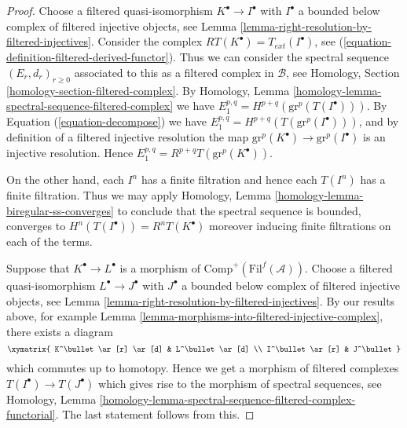 \begin{proof}
Choose a filtered quasi-isomorphism $K^\bullet \to I^\bullet$
with $I^\bullet$ a bounded below complex of filtered injective objects, see
Lemma \ref{lemma-right-resolution-by-filtered-injectives}.
Consider the complex $RT(K^\bullet) = T_{ext}(I^\bullet)$, see
(\ref{equation-definition-filtered-derived-functor}).
Thus we can consider the spectral sequence
$(E_r, d_r)_{r \geq 0}$ associated to
this as a filtered complex in $\mathcal{B}$, see
Homology, Section \ref{homology-section-filtered-complex}.
By
Homology, Lemma \ref{homology-lemma-spectral-sequence-filtered-complex}
we have $E_1^{p, q} = H^{p + q}(\text{gr}^p(T(I^\bullet)))$.
By Equation (\ref{equation-decompose}) we have
$E_1^{p, q} = H^{p + q}(T(\text{gr}^p(I^\bullet)))$, and
by definition of a filtered injective resolution the
map $\text{gr}^p(K^\bullet) \to \text{gr}^p(I^\bullet)$
is an injective resolution. Hence
$E_1^{p, q} = R^{p + q}T(\text{gr}^p(K^\bullet))$.

\medskip\noindent
On the other hand, each $I^n$ has a finite filtration and hence
each $T(I^n)$ has a finite filtration. Thus we may apply
Homology, Lemma \ref{homology-lemma-biregular-ss-converges}
to conclude that the spectral sequence is bounded, converges to
$H^n(T(I^\bullet)) = R^nT(K^\bullet)$
moreover inducing finite filtrations on each of the terms.

\medskip\noindent
Suppose that $K^\bullet \to L^\bullet$ is a morphism of
$\text{Comp}^{+}(\text{Fil}^f(\mathcal{A}))$.
Choose a filtered quasi-isomorphism $L^\bullet \to J^\bullet$
with $J^\bullet$ a bounded below complex of filtered injective
objects, see
Lemma \ref{lemma-right-resolution-by-filtered-injectives}.
By our results above,
for example
Lemma \ref{lemma-morphisms-into-filtered-injective-complex},
there exists a diagram
$$
\xymatrix{
K^\bullet \ar[r] \ar[d] & L^\bullet \ar[d] \\
I^\bullet \ar[r] & J^\bullet
}
$$
which commutes up to homotopy. Hence we get a morphism of filtered
complexes $T(I^\bullet) \to T(J^\bullet)$ which gives rise to the
morphism of spectral sequences, see
Homology,
Lemma \ref{homology-lemma-spectral-sequence-filtered-complex-functorial}.
The last statement follows from this.
\end{proof}

